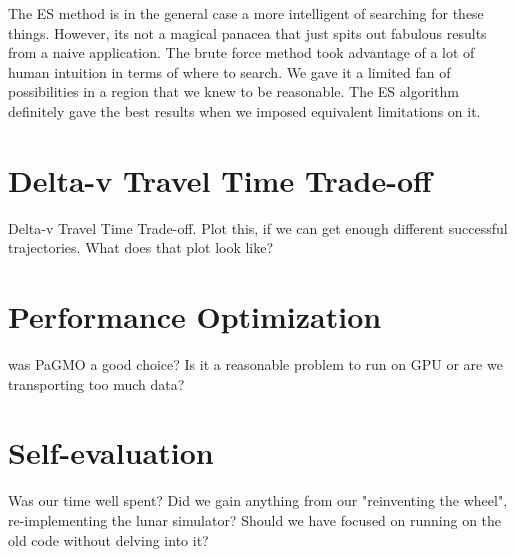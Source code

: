 The ES method is in the general case a more intelligent of searching for these things. However, its not a magical panacea that just spits out fabulous results from a naive application. The brute force method took advantage of a lot of human intuition in terms of where to search. We gave it a limited fan of possibilities in a region that we knew to be reasonable. The ES algorithm definitely gave the best results when we imposed equivalent limitations on it.

\section{Delta-v Travel Time Trade-off}
Delta-v Travel Time Trade-off. Plot this, if we can get enough different successful trajectories. What does that plot look like?

\section{Performance Optimization}
was PaGMO a good choice? Is it a reasonable problem to run on GPU or are we transporting too much data?

\section{Self-evaluation}
Was our time well spent? Did we gain anything from our "reinventing the wheel", re-implementing the lunar simulator? Should we have focused on running on the old code without delving into it?